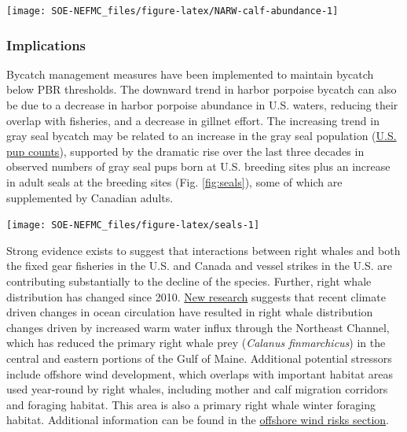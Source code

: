 \documentclass[
  10pt,
]{article}
\let\origfigure\figure
\let\endorigfigure\endfigure
\renewenvironment{figure}[1][2] {
    \expandafter\origfigure\expandafter[H]
} {
    \endorigfigure
}
\begin{document}
\begin{figure}

{\centering \texttt{[image: SOE-NEFMC\_files/figure-latex/NARW-calf-abundance-1]} 

}

\caption{Number of North Atlantic right whale calf births, 1990 - 2021.}\label{fig:NARW-calf-abundance}
\end{figure}

\hypertarget{implications-5}{%
\subsubsection{Implications}\label{implications-5}}

Bycatch management measures have been implemented to maintain bycatch below PBR thresholds. The downward trend in harbor porpoise bycatch can also be due to a decrease in harbor porpoise abundance in U.S. waters, reducing their overlap with fisheries, and a decrease in gillnet effort. The increasing trend in gray seal bycatch may be related to an increase in the gray seal population (\href{https://noaa-edab.github.io/catalog/gray-seal-pups.html}{U.S. pup counts}), supported by the dramatic rise over the last three decades in observed numbers of gray seal pups born at U.S. breeding sites plus an increase in adult seals at the breeding sites (Fig. \ref{fig:seals}), some of which are supplemented by Canadian adults.

\begin{figure}

{\centering \texttt{[image: SOE-NEFMC\_files/figure-latex/seals-1]} 

}

\caption{Estimated number of gray seal pups born at four United States pupping colonies at various times from 1988 to 2021. Recreated from Wood et al. 2022 (Figure 5).}\label{fig:seals}
\end{figure}

Strong evidence exists to suggest that interactions between right whales and both the fixed gear fisheries in the U.S. and Canada and vessel strikes in the U.S. are contributing substantially to the decline of the species. Further, right whale distribution has changed since 2010. \href{https://noaa-edab.github.io/catalog/right-whale-abundance.html}{New research} suggests that recent climate driven changes in ocean circulation have resulted in right whale distribution changes driven by increased warm water influx through the Northeast Channel, which has reduced the primary right whale prey (\emph{Calanus finmarchicus}) in the central and eastern portions of the Gulf of Maine. Additional potential stressors include offshore wind development, which overlaps with important habitat areas used year-round by right whales, including mother and calf migration corridors and foraging habitat. This area is also a primary right whale winter foraging habitat. Additional information can be found in the \protect\hyperlink{other-ocean-uses:-offshore-wind}{offshore wind risks section}.
\end{document}
